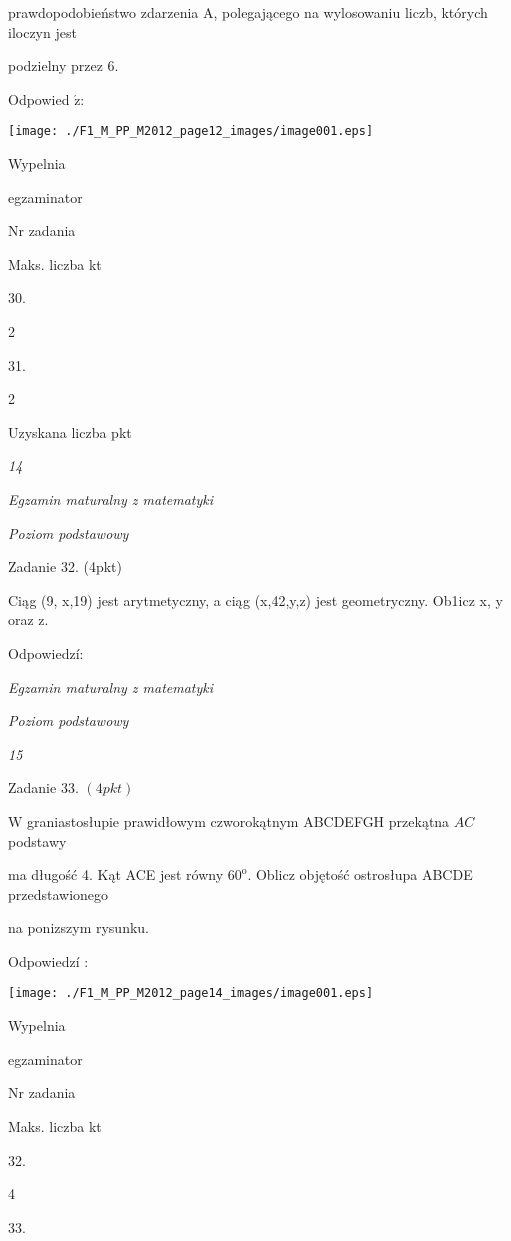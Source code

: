 \documentclass[a4paper,12pt]{article}
\begin{document}
prawdopodobieństwo zdarzenia A, polegającego na wylosowaniu liczb, których iloczyn jest

podzielny przez 6.

Odpowied $\acute{\mathrm{z}}$:
\begin{center}
\texttt{[image: ./F1\_M\_PP\_M2012\_page12\_images/image001.eps]}
\end{center}
Wypelnia

egzaminator

Nr zadania

Maks. liczba kt

30.

2

31.

2

Uzyskana liczba pkt





{\it 14}

{\it Egzamin maturalny z matematyki}

{\it Poziom podstawowy}

Zadanie 32. (4pkt)

Ciąg (9, x,19) jest arytmetyczny, a ciąg (x,42,y,z) jest geometryczny. Ob1icz x, y oraz z.

Odpowiedzí:





{\it Egzamin maturalny z matematyki}

{\it Poziom podstawowy}

{\it 15}

Zadanie 33. $(4pkt)$

$\mathrm{W}$ graniastosłupie prawidłowym czworokątnym ABCDEFGH przekątna $AC$ podstawy

ma długość 4. Kąt ACE jest równy $60^{\mathrm{o}}$. Oblicz objętość ostrosłupa ABCDE przedstawionego

na ponizszym rysunku.

Odpowiedzí :
\begin{center}
\texttt{[image: ./F1\_M\_PP\_M2012\_page14\_images/image001.eps]}
\end{center}
Wypelnia

egzaminator

Nr zadania

Maks. liczba kt

32.

4

33.
\end{document}
